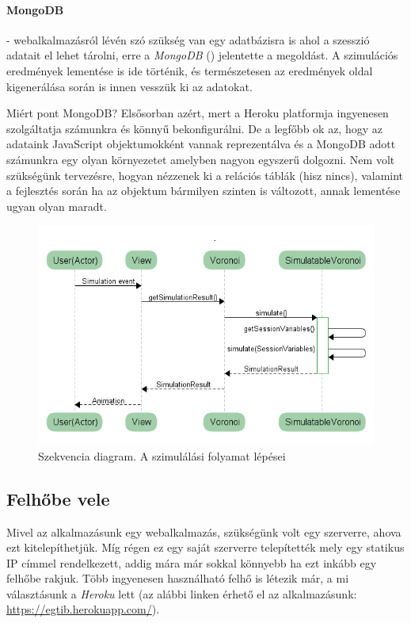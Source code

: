 \paragraph{MongoDB} - webalkalmazásról lévén szó szükség van egy adatbázisra is ahol a szesszió adatait el lehet tárolni, erre a \textit{MongoDB} (\cite{soft:mongodb}) jelentette a megoldást. A szimulációs eredmények lementése is ide történik, és természetesen az eredmények oldal kigenerálása során is innen vesszük ki az adatokat.

Miért pont MongoDB? Elsősorban azért, mert a Heroku platformja ingyenesen szolgáltatja számunkra és könnyű bekonfigurálni. De a legfőbb ok az, hogy az adataink JavaScript objektumokként vannak reprezentálva és a MongoDB adott számunkra egy olyan környezetet amelyben nagyon egyszerű dolgozni. Nem volt szükségünk tervezésre, hogyan nézzenek ki a relációs táblák (hisz nincs), valamint a fejlesztés során ha az objektum bármilyen szinten is változott, annak lementése ugyan olyan maradt.

\begin{figure}[ht!]
	\centering
	\includegraphics[width=\linewidth]{images/SimulationProcess}
	\caption{Szekvencia diagram. A szimulálási folyamat lépései}
	\label{fig:SimulationProcess}
\end{figure}

\subsection{Felhőbe vele}

Mivel az alkalmazásunk egy webalkalmazás, szükségünk volt egy szerverre, ahova ezt kitelepíthetjük. Míg régen ez egy saját szerverre telepítették mely egy statikus IP címmel rendelkezett, addig mára már sokkal könnyebb ha ezt inkább egy felhőbe rakjuk. Több ingyenesen használható felhő is létezik már, a mi választásunk a \textit{Heroku} lett (az alábbi linken érhető el az alkalmazásunk: \url{https://egtib.herokuapp.com/}).

